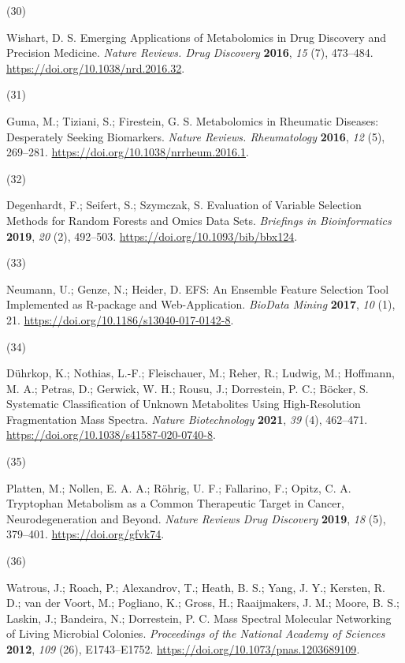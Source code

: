 \documentclass[
]{article}
\newlength{\cslhangindent}
\newlength{\csllabelwidth}
\newlength{\cslentryspacingunit} %
\newenvironment{CSLReferences}[2] %
 {%
  \setlength{\parindent}{0pt}
  \ifodd #1
  \let\oldpar\par
  \def\par{\hangindent=\cslhangindent\oldpar}
  \fi
  \setlength{\parskip}{#2\cslentryspacingunit}
 }%
 {}
\newcommand{\CSLLeftMargin}[1]{\parbox[t]{\csllabelwidth}{#1}}
\newcommand{\CSLRightInline}[1]{\parbox[t]{\linewidth - \csllabelwidth}{#1}\break}
\begin{document}
\begin{CSLReferences}{0}{0}
\leavevmode{}%
\CSLLeftMargin{(30) }%
\CSLRightInline{Wishart, D. S. Emerging Applications of Metabolomics in
Drug Discovery and Precision Medicine. \emph{Nature Reviews. Drug
Discovery} \textbf{2016}, \emph{15} (7), 473--484.
\url{https://doi.org/10.1038/nrd.2016.32}.}

\leavevmode{}%
\CSLLeftMargin{(31) }%
\CSLRightInline{Guma, M.; Tiziani, S.; Firestein, G. S. Metabolomics in
Rheumatic Diseases: Desperately Seeking Biomarkers. \emph{Nature
Reviews. Rheumatology} \textbf{2016}, \emph{12} (5), 269--281.
\url{https://doi.org/10.1038/nrrheum.2016.1}.}

\leavevmode{}%
\CSLLeftMargin{(32) }%
\CSLRightInline{Degenhardt, F.; Seifert, S.; Szymczak, S. Evaluation of
Variable Selection Methods for Random Forests and Omics Data Sets.
\emph{Briefings in Bioinformatics} \textbf{2019}, \emph{20} (2),
492--503. \url{https://doi.org/10.1093/bib/bbx124}.}

\leavevmode{}%
\CSLLeftMargin{(33) }%
\CSLRightInline{Neumann, U.; Genze, N.; Heider, D. {EFS}: An Ensemble
Feature Selection Tool Implemented as {R-package} and Web-Application.
\emph{BioData Mining} \textbf{2017}, \emph{10} (1), 21.
\url{https://doi.org/10.1186/s13040-017-0142-8}.}

\leavevmode{}%
\CSLLeftMargin{(34) }%
\CSLRightInline{Dührkop, K.; Nothias, L.-F.; Fleischauer, M.; Reher, R.;
Ludwig, M.; Hoffmann, M. A.; Petras, D.; Gerwick, W. H.; Rousu, J.;
Dorrestein, P. C.; Böcker, S. Systematic Classification of Unknown
Metabolites Using High-Resolution Fragmentation Mass Spectra.
\emph{Nature Biotechnology} \textbf{2021}, \emph{39} (4), 462--471.
\url{https://doi.org/10.1038/s41587-020-0740-8}.}

\leavevmode{}%
\CSLLeftMargin{(35) }%
\CSLRightInline{Platten, M.; Nollen, E. A. A.; Röhrig, U. F.; Fallarino,
F.; Opitz, C. A. Tryptophan Metabolism as a Common Therapeutic Target in
Cancer, Neurodegeneration and Beyond. \emph{Nature Reviews Drug
Discovery} \textbf{2019}, \emph{18} (5), 379--401.
\url{https://doi.org/gfvk74}.}

\leavevmode{}%
\CSLLeftMargin{(36) }%
\CSLRightInline{Watrous, J.; Roach, P.; Alexandrov, T.; Heath, B. S.;
Yang, J. Y.; Kersten, R. D.; van der Voort, M.; Pogliano, K.; Gross, H.;
Raaijmakers, J. M.; Moore, B. S.; Laskin, J.; Bandeira, N.; Dorrestein,
P. C. Mass Spectral Molecular Networking of Living Microbial Colonies.
\emph{Proceedings of the National Academy of Sciences} \textbf{2012},
\emph{109} (26), E1743--E1752.
\url{https://doi.org/10.1073/pnas.1203689109}.}


\end{CSLReferences}
\end{document}
